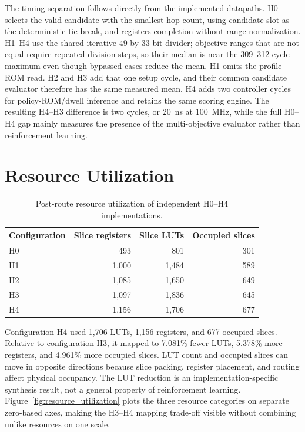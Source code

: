 The timing separation follows directly from the implemented datapaths. H0 selects
the valid candidate with the smallest hop count, using candidate slot as the
deterministic tie-break, and registers completion without range normalization.
H1--H4 use the shared iterative 49-by-33-bit divider; objective ranges that are not
equal require repeated division steps, so their median is near the 309--312-cycle
maximum even though bypassed cases reduce the mean. H1 omits the profile-ROM read.
H2 and H3 add that one setup cycle, and their common candidate evaluator therefore
has the same measured mean. H4 adds two controller cycles for policy-ROM/dwell
inference and retains the same scoring engine. The resulting H4--H3 difference is
two cycles, or 20~ns at 100~MHz, while the full H0--H4 gap mainly measures the
presence of the multi-objective evaluator rather than reinforcement learning.

\section{Resource Utilization}

\begin{table}[H]
\centering
\caption{Post-route resource utilization of independent H0--H4 implementations.}
\label{tab:resources}
\begin{tabular}{@{}lrrr@{}}
\toprule
\textbf{Configuration} & \textbf{Slice registers} & \textbf{Slice LUTs} &
\textbf{Occupied slices}\\
\midrule
H0 & 493 & 801 & 301\\
H1 & 1,000 & 1,484 & 589\\
H2 & 1,085 & 1,650 & 649\\
H3 & 1,097 & 1,836 & 645\\
H4 & 1,156 & 1,706 & 677\\
\bottomrule
\end{tabular}
\end{table}

Configuration H4 used 1,706 LUTs, 1,156 registers, and 677 occupied slices. Relative
to configuration H3, it mapped to 7.081\% fewer LUTs, 5.378\% more registers, and
4.961\% more occupied slices. LUT count and occupied slices can move in opposite
directions because slice packing, register placement, and routing affect physical
occupancy. The LUT reduction is an implementation-specific synthesis result, not a
general property of reinforcement learning.
Figure~\ref{fig:resource_utilization} plots the three resource categories on
separate zero-based axes, making the H3--H4 mapping trade-off visible without
combining unlike resources on one scale.

